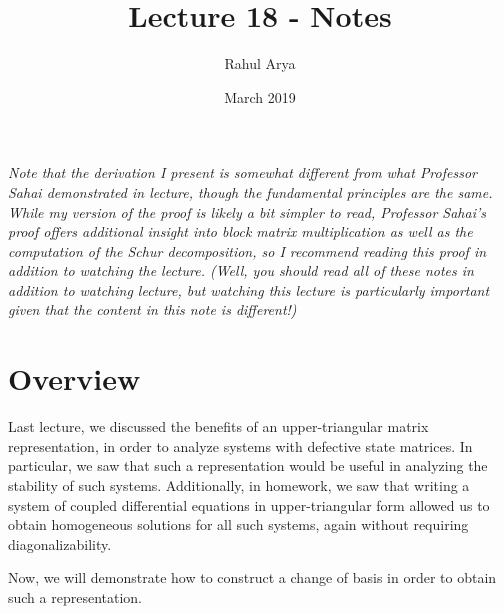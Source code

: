 \documentclass[letterpaper]{article}
\title{Lecture 18 - Notes}
\author{Rahul Arya}
\date{March 2019}
\theoremstyle{remark}
\begin{document}
\maketitle

\emph{Note that the derivation I present is somewhat different from what Professor Sahai demonstrated in lecture, though the fundamental principles are the same. While my version of the proof is likely a bit simpler to read, Professor Sahai's proof offers additional insight into block matrix multiplication as well as the computation of the Schur decomposition, so I recommend reading this proof in addition to watching the lecture. (Well, you should read all of these notes in addition to watching lecture, but watching this lecture is particularly important given that the content in this note is different!)}

\section{Overview}
Last lecture, we discussed the benefits of an upper-triangular matrix representation, in order to analyze systems with defective state matrices. In particular, we saw that such a representation would be useful in analyzing the stability of such systems. Additionally, in homework, we saw that writing a system of coupled differential equations in upper-triangular form allowed us to obtain homogeneous solutions for all such systems, again without requiring diagonalizability.

Now, we will demonstrate how to construct a change of basis in order to obtain such a representation.
\end{document}
